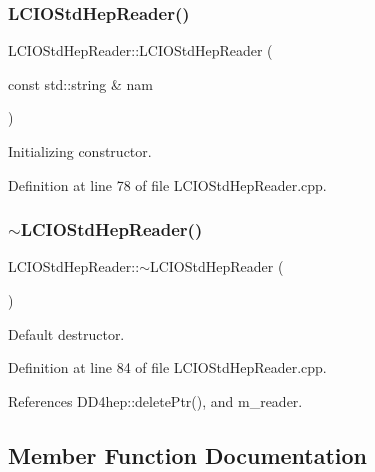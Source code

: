\subsubsection{\texorpdfstring{L\+C\+I\+O\+Std\+Hep\+Reader()}{LCIOStdHepReader()}}
{\footnotesize\ttfamily L\+C\+I\+O\+Std\+Hep\+Reader\+::\+L\+C\+I\+O\+Std\+Hep\+Reader (\begin{DoxyParamCaption}\item[{const std\+::string \&}]{nam }\end{DoxyParamCaption})}



Initializing constructor. 



Definition at line 78 of file L\+C\+I\+O\+Std\+Hep\+Reader.\+cpp.

\hypertarget{class_d_d4hep_1_1_simulation_1_1_l_c_i_o_std_hep_reader_a8435282d1017281ed60c84dee829859e}{}\label{class_d_d4hep_1_1_simulation_1_1_l_c_i_o_std_hep_reader_a8435282d1017281ed60c84dee829859e} 
\subsubsection{\texorpdfstring{$\sim$\+L\+C\+I\+O\+Std\+Hep\+Reader()}{~LCIOStdHepReader()}}
{\footnotesize\ttfamily L\+C\+I\+O\+Std\+Hep\+Reader\+::$\sim$\+L\+C\+I\+O\+Std\+Hep\+Reader (\begin{DoxyParamCaption}{ }\end{DoxyParamCaption})\hspace{0.3cm}{\ttfamily [virtual]}}



Default destructor. 



Definition at line 84 of file L\+C\+I\+O\+Std\+Hep\+Reader.\+cpp.



References D\+D4hep\+::delete\+Ptr(), and m\+\_\+reader.



\subsection{Member Function Documentation}
\hypertarget{class_d_d4hep_1_1_simulation_1_1_l_c_i_o_std_hep_reader_a5f91d2bbdab11ee4554abf164acf1e1e}{}\label{class_d_d4hep_1_1_simulation_1_1_l_c_i_o_std_hep_reader_a5f91d2bbdab11ee4554abf164acf1e1e} 

